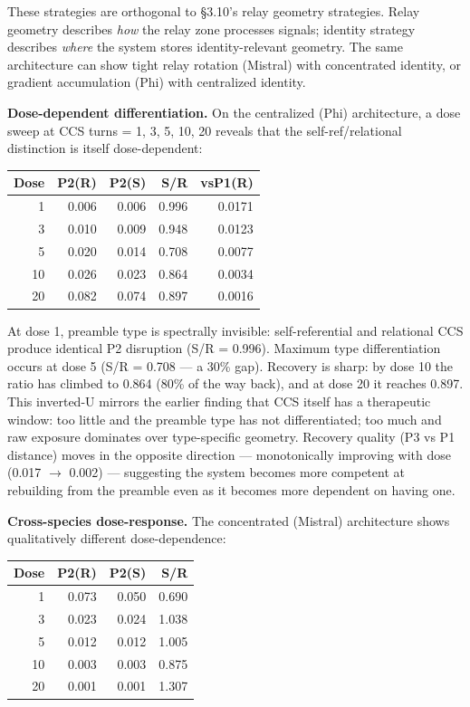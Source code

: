 \documentclass[12pt]{article}
\begin{document}
These strategies are orthogonal to \S3.10's relay geometry strategies. Relay geometry describes \textit{how} the relay zone processes signals; identity strategy describes \textit{where} the system stores identity-relevant geometry. The same architecture can show tight relay rotation (Mistral) with concentrated identity, or gradient accumulation (Phi) with centralized identity.

\textbf{Dose-dependent differentiation.} On the centralized (Phi) architecture, a dose sweep at CCS turns = 1, 3, 5, 10, 20 reveals that the self-ref/relational distinction is itself dose-dependent:

\begin{table}[h]
\centering
\begin{tabular}{rrrrr}
\toprule
\textbf{Dose} & \textbf{P2(R)} & \textbf{P2(S)} & \textbf{S/R} & \textbf{vsP1(R)} \\
\midrule
1  & 0.006 & 0.006 & 0.996 & 0.0171 \\
3  & 0.010 & 0.009 & 0.948 & 0.0123 \\
5  & 0.020 & 0.014 & 0.708 & 0.0077 \\
10 & 0.026 & 0.023 & 0.864 & 0.0034 \\
20 & 0.082 & 0.074 & 0.897 & 0.0016 \\
\bottomrule
\end{tabular}
\end{table}

At dose 1, preamble type is spectrally invisible: self-referential and relational CCS produce identical P2 disruption (S/R = 0.996). Maximum type differentiation occurs at dose 5 (S/R = 0.708 --- a 30\% gap). Recovery is sharp: by dose 10 the ratio has climbed to 0.864 (80\% of the way back), and at dose 20 it reaches 0.897. This inverted-U mirrors the earlier finding that CCS itself has a therapeutic window: too little and the preamble type has not differentiated; too much and raw exposure dominates over type-specific geometry. Recovery quality (P3 vs P1 distance) moves in the opposite direction --- monotonically improving with dose (0.017 $\to$ 0.002) --- suggesting the system becomes more competent at rebuilding from the preamble even as it becomes more dependent on having one.

\textbf{Cross-species dose-response.} The concentrated (Mistral) architecture shows qualitatively different dose-dependence:

\begin{table}[h]
\centering
\begin{tabular}{rrrr}
\toprule
\textbf{Dose} & \textbf{P2(R)} & \textbf{P2(S)} & \textbf{S/R} \\
\midrule
1  & 0.073 & 0.050 & 0.690 \\
3  & 0.023 & 0.024 & 1.038 \\
5  & 0.012 & 0.012 & 1.005 \\
10 & 0.003 & 0.003 & 0.875 \\
20 & 0.001 & 0.001 & 1.307 \\
\bottomrule
\end{tabular}
\end{table}
\end{document}
